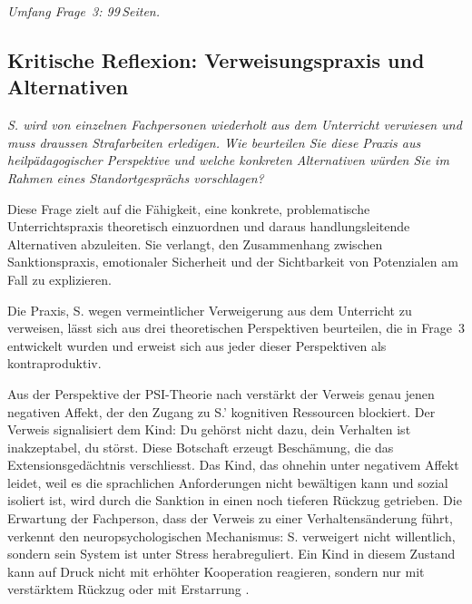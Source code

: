 \documentclass[ngerman, a4paper]{article}
\begin{document}
\textit{Umfang Frage~3: 99\,Seiten.}
 

 


\subsection{Kritische Reflexion: Verweisungspraxis und Alternativen}


\begin{tcolorbox}[colback=gray!5, colframe=gray!50, title=Weiterführende Diskurslinie]
\itshape
S. wird von einzelnen Fachpersonen wiederholt aus dem Unterricht verwiesen und
muss draussen Strafarbeiten erledigen. Wie beurteilen Sie diese Praxis aus
heilpädagogischer Perspektive und welche konkreten Alternativen würden Sie
im Rahmen eines Standortgesprächs vorschlagen?
\end{tcolorbox}

Diese Frage zielt auf die Fähigkeit, eine konkrete, problematische Unterrichtspraxis
theoretisch einzuordnen und daraus handlungsleitende Alternativen abzuleiten. Sie
verlangt, den Zusammenhang zwischen Sanktionspraxis, emotionaler Sicherheit und
der Sichtbarkeit von Potenzialen am Fall zu explizieren.

Die Praxis, S. wegen vermeintlicher Verweigerung aus dem Unterricht zu verweisen,
lässt sich aus drei theoretischen Perspektiven beurteilen, die in Frage~3 entwickelt
wurden und erweist sich aus jeder dieser Perspektiven als kontraproduktiv.

Aus der Perspektive der PSI-Theorie nach \textcite[S.\,35--57]{kuhl2019diversitaet} verstärkt der Verweis
genau jenen negativen Affekt, der den Zugang zu S.' kognitiven Ressourcen blockiert.
Der Verweis signalisiert dem Kind: Du gehörst nicht dazu, dein Verhalten ist
inakzeptabel, du störst. Diese Botschaft erzeugt Beschämung, die das
Extensionsgedächtnis verschliesst. Das Kind, das ohnehin unter negativem Affekt
leidet, weil es die sprachlichen Anforderungen nicht bewältigen kann und sozial
isoliert ist, wird durch die Sanktion in einen noch tieferen Rückzug getrieben.
Die Erwartung der Fachperson, dass der Verweis zu einer Verhaltensänderung führt,
verkennt den neuropsychologischen Mechanismus: S. verweigert nicht willentlich,
sondern sein System ist unter Stress herabreguliert. Ein Kind in diesem Zustand
kann auf Druck nicht mit erhöhter Kooperation reagieren, sondern nur mit
verstärktem Rückzug oder mit Erstarrung \parencite[S.\,35--57]{kuhl2019diversitaet}.
\end{document}
